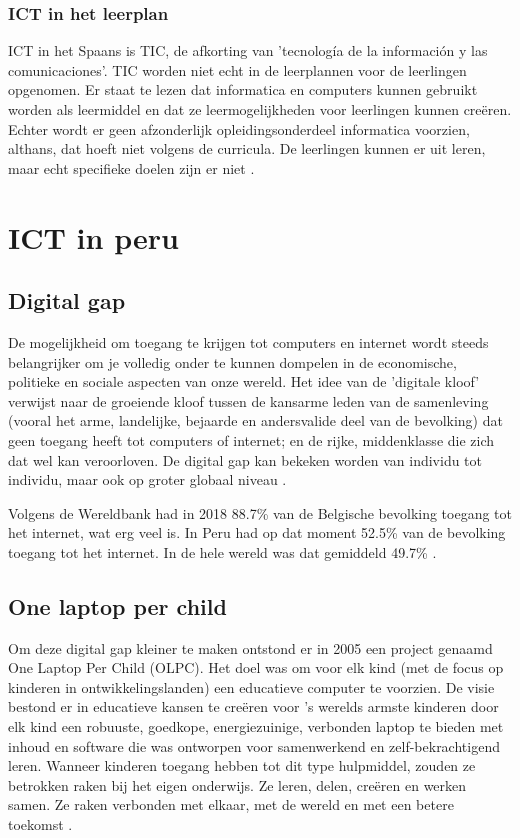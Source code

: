 \subsubsection{ICT in het leerplan}
ICT in het Spaans is TIC, de afkorting van 'tecnología de la información y las comunicaciones'. TIC worden niet echt in de leerplannen voor de leerlingen opgenomen. Er staat te lezen dat informatica en computers kunnen gebruikt worden als leermiddel en dat ze leermogelijkheden voor leerlingen kunnen creëren. Echter wordt er geen afzonderlijk opleidingsonderdeel informatica voorzien, althans, dat hoeft niet volgens de curricula. De leerlingen kunnen er uit leren, maar echt specifieke doelen zijn er niet \autocite{MINEDU2016}.

\section{ICT in peru}
\subsection{Digital gap}
De mogelijkheid om toegang te krijgen tot computers en internet wordt steeds belangrijker om je volledig onder te kunnen dompelen in de economische, politieke en sociale aspecten van onze wereld. Het idee van de 'digitale kloof' verwijst naar de groeiende kloof tussen de kansarme leden van de samenleving (vooral het arme, landelijke, bejaarde en andersvalide deel van de bevolking) dat geen toegang heeft tot computers of internet; en de rijke, middenklasse die  zich dat wel kan veroorloven. De digital gap kan bekeken worden van individu tot individu, maar ook op groter globaal niveau \autocite{Marichick2000}.

Volgens de Wereldbank had in 2018 88.7\% van de Belgische bevolking toegang tot het internet, wat erg veel is. In Peru had op dat moment 52.5\% van de bevolking toegang tot het internet. In de hele wereld was dat gemiddeld 49.7\% \autocite{WereldBank2018}.

\subsection{One laptop per child}
Om deze digital gap kleiner te maken ontstond er in 2005 een project genaamd One Laptop Per Child (OLPC). Het doel was om voor elk kind (met de focus op kinderen in ontwikkelingslanden) een educatieve computer te voorzien. De visie bestond er in educatieve kansen te creëren voor 's werelds armste kinderen door elk kind een robuuste, goedkope, energiezuinige, verbonden laptop te bieden met inhoud en software die was ontworpen voor samenwerkend en zelf-bekrachtigend leren. Wanneer kinderen toegang hebben tot dit type hulpmiddel, zouden ze betrokken raken bij het eigen onderwijs. Ze leren, delen, creëren en werken samen. Ze raken verbonden met elkaar, met de wereld en met een betere toekomst \autocite{OneLaptopPerChild2005}.

